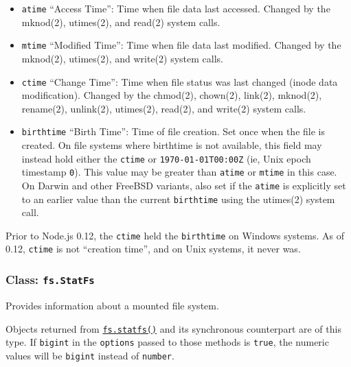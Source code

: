 \begin{itemize}
\tightlist
\item
  \texttt{atime} ``Access Time'': Time when file data last accessed.
  Changed by the mknod(2), utimes(2), and read(2) system calls.
\item
  \texttt{mtime} ``Modified Time'': Time when file data last modified.
  Changed by the mknod(2), utimes(2), and write(2) system calls.
\item
  \texttt{ctime} ``Change Time'': Time when file status was last changed
  (inode data modification). Changed by the chmod(2), chown(2), link(2),
  mknod(2), rename(2), unlink(2), utimes(2), read(2), and write(2)
  system calls.
\item
  \texttt{birthtime} ``Birth Time'': Time of file creation. Set once
  when the file is created. On file systems where birthtime is not
  available, this field may instead hold either the \texttt{ctime} or
  \texttt{1970-01-01T00:00Z} (ie, Unix epoch timestamp \texttt{0}). This
  value may be greater than \texttt{atime} or \texttt{mtime} in this
  case. On Darwin and other FreeBSD variants, also set if the
  \texttt{atime} is explicitly set to an earlier value than the current
  \texttt{birthtime} using the utimes(2) system call.
\end{itemize}

Prior to Node.js 0.12, the \texttt{ctime} held the \texttt{birthtime} on
Windows systems. As of 0.12, \texttt{ctime} is not ``creation time'',
and on Unix systems, it never was.

\subsubsection{\texorpdfstring{Class:
\texttt{fs.StatFs}}{Class: fs.StatFs}}\label{class-fs.statfs}

Provides information about a mounted file system.

Objects returned from
\hyperref[fsstatfspath-options-callback]{\texttt{fs.statfs()}} and its
synchronous counterpart are of this type. If \texttt{bigint} in the
\texttt{options} passed to those methods is \texttt{true}, the numeric
values will be \texttt{bigint} instead of \texttt{number}.

\begin{Shaded}
\begin{Highlighting}[]
\NormalTok{\}}
\end{Highlighting}
\end{Shaded}


